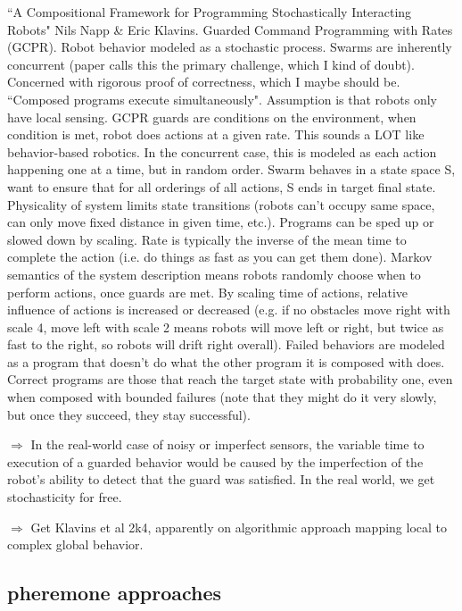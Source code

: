 \documentclass[]{article}
\begin{document}
``A Compositional Framework for Programming Stochastically Interacting Robots" \cite{napp2011compositional} Nils Napp \& Eric Klavins. Guarded Command Programming with Rates (GCPR). Robot behavior modeled as a stochastic process. Swarms are inherently concurrent (paper calls this the primary challenge, which I kind of doubt). Concerned with rigorous proof of correctness, which I maybe should be. ``Composed programs execute simultaneously". Assumption is that robots only have local sensing. GCPR guards are conditions on the environment, when condition is met, robot does actions at a given rate. This sounds a LOT like behavior-based robotics. In the concurrent case, this is modeled as each action happening one at a time, but in random order. Swarm behaves in a state space S, want to ensure that for all orderings of all actions, S ends in target final state. Physicality of system limits state transitions (robots can't occupy same space, can only move fixed distance in given time, etc.). Programs can be sped up or slowed down by scaling. Rate is typically the inverse of the mean time to complete the action (i.e. do things as fast as you can get them done). Markov semantics of the system description means robots randomly choose when to perform actions, once guards are met. By scaling time of actions, relative influence of actions is increased or decreased (e.g. if no obstacles move right with scale 4, move left with scale 2 means robots will move left or right, but twice as fast to the right, so robots will drift right overall). Failed behaviors are modeled as a program that doesn't do what the other program it is composed with does. Correct programs are those that reach the target state with probability one, even when composed with bounded failures (note that they might do it very slowly, but once they succeed, they stay successful).

$\Rightarrow$ In the real-world case of noisy or imperfect sensors, the variable time to execution of a guarded behavior would be caused by the imperfection of the robot's ability to detect that the guard was satisfied. In the real world, we get stochasticity for free. 

$\Rightarrow$ Get Klavins et al 2k4, apparently on algorithmic approach mapping local to complex global behavior.

\subsection{pheremone approaches}
\end{document}
